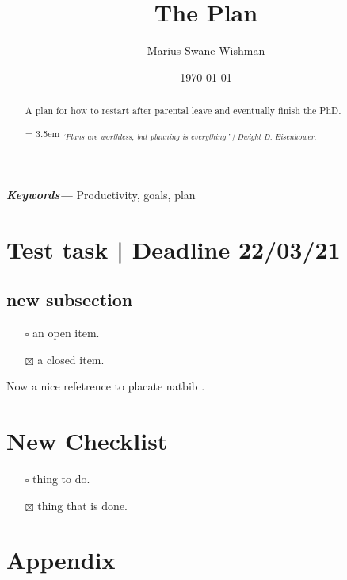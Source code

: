 \documentclass[12pt]{article}
\title{The Plan}
\author[1]{Marius Swane Wishman}
\affil[1]{Department of Sociology and Political Science, NTNU}
\date{\today}
\providecommand{\keywords}[1]
{
	\small	
	\textbf{\textit{Keywords---}} #1
}
\begin{document}
\maketitle

\begin{abstract}
	A plan for how to restart after parental leave and eventually finish the
	PhD.

\bigskip
\hangindent = 3.5em
\emph{\textsubscript{`Plans are worthless, but planning is everything.' | 
		Dwight D. Eisenhower.
}}
\end{abstract}

\bigskip
\keywords{Productivity, goals, plan}

\pagebreak


\onehalfspacing

\section{Test task | Deadline 22/03/21}

\subsection{new subsection}
\begin{itemize}
	\item[$\square$] an open item.
	\item[$\boxtimes$] a closed item.
\end{itemize}

Now a nice refetrence to placate natbib \citep{Alesina2011}.
\section{New Checklist}
\begin{itemize}
	\item[$\square$] thing to do.
		\item[$\boxtimes$] thing that is done.
\end{itemize}
\section{}

\section{}

\pagebreak


{}

\section{Appendix}
\end{document}
